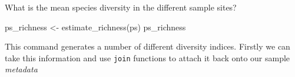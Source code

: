 \documentclass[
]{book}
\newenvironment{Shaded}{\begin{snugshade}}{\end{snugshade}}
\newcommand{\FunctionTok}[1]{\textcolor[rgb]{0.00,0.00,0.00}{#1}}
\newcommand{\NormalTok}[1]{#1}
\newcommand{\OtherTok}[1]{\textcolor[rgb]{0.56,0.35,0.01}{#1}}
\newcommand{\SpecialCharTok}[1]{\textcolor[rgb]{0.00,0.00,0.00}{#1}}
\newcommand{\StringTok}[1]{\textcolor[rgb]{0.31,0.60,0.02}{#1}}
\begin{document}
What is the mean species diversity in the different sample sites?

\begin{Shaded}
\begin{Highlighting}[]
\NormalTok{ps\_richness }\OtherTok{\textless{}{-}} \FunctionTok{estimate\_richness}\NormalTok{(ps)}
\NormalTok{ps\_richness}
\end{Highlighting}
\end{Shaded}

This command generates a number of different diversity indices.
Firstly we can take this information and use \texttt{join} functions to attach it back onto our sample \emph{metadata}

\begin{Shaded}
\end{Shaded}
\end{document}
